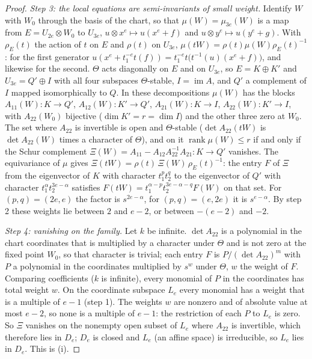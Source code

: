 \documentclass[11pt]{article}
\theoremstyle{definition}
\theoremstyle{remark}
\begin{document}
\begin{proof}
\emph{Step 3: the local equations are semi-invariants of small weight.} Identify $W$ with $W_0$ through the basis of the chart, so that $\mu(W)=\mu_{3e}(W)$ is a map from $E=U_{2e}\otimes W_0$ to $U_{3e}$, $u\otimes x^e\mapsto u(x^e+f)$ and $u\otimes y^e\mapsto u(y^e+g)$. With $\rho_E(t)$ the action of $t$ on $E$ and $\rho(t)$ on $U_{3e}$, $\mu(tW)=\rho(t)\mu(W)\rho_E(t)^{-1}$: for the first generator $u(x^e+t_1^{-e}t(f))=t_1^{-e}t\big(t^{-1}(u)(x^e+f)\big)$, and likewise for the second. $\Theta$ acts diagonally on $E$ and on $U_{3e}$, so $E=K\oplus K'$ and $U_{3e}=Q'\oplus I$ with all four subspaces $\Theta$-stable, $I=\operatorname{im}A$, and $Q'$ a complement of $I$ mapped isomorphically to $Q$. In these decompositions $\mu(W)$ has the blocks $A_{11}(W):K\to Q'$, $A_{12}(W):K'\to Q'$, $A_{21}(W):K\to I$, $A_{22}(W):K'\to I$, with $A_{22}(W_0)$ bijective ($\dim K'=r=\dim I$) and the other three zero at $W_0$. The set where $A_{22}$ is invertible is open and $\Theta$-stable ($\det A_{22}(tW)$ is $\det A_{22}(W)$ times a character of $\Theta$), and on it $\operatorname{rank}\mu(W)\le r$ if and only if the Schur complement $\Xi(W)=A_{11}-A_{12}A_{22}^{-1}A_{21}:K\to Q'$ vanishes. The equivariance of $\mu$ gives $\Xi(tW)=\rho(t)\,\Xi(W)\,\rho_E(t)^{-1}$: the entry $F$ of $\Xi$ from the eigenvector of $K$ with character $t_1^pt_2^q$ to the eigenvector of $Q'$ with character $t_1^{\alpha}t_2^{3e-\alpha}$ satisfies $F(tW)=t_1^{\alpha-p}t_2^{3e-\alpha-q}F(W)$ on that set. For $(p,q)=(2e,e)$ the factor is $s^{2e-\alpha}$, for $(p,q)=(e,2e)$ it is $s^{e-\alpha}$. By step 2 these weights lie between $2$ and $e-2$, or between $-(e-2)$ and $-2$.

\emph{Step 4: vanishing on the family.} Let $k$ be infinite. $\det A_{22}$ is a polynomial in the chart coordinates that is multiplied by a character under $\Theta$ and is not zero at the fixed point $W_0$, so that character is trivial; each entry $F$ is $P/(\det A_{22})^{m}$ with $P$ a polynomial in the coordinates multiplied by $s^{w}$ under $\Theta$, $w$ the weight of $F$. Comparing coefficients ($k$ is infinite), every monomial of $P$ in the coordinates has total weight $w$. On the coordinate subspace $L_e$ every monomial has a weight that is a multiple of $e-1$ (step 1). The weights $w$ are nonzero and of absolute value at most $e-2$, so none is a multiple of $e-1$: the restriction of each $P$ to $L_e$ is zero. So $\Xi$ vanishes on the nonempty open subset of $L_e$ where $A_{22}$ is invertible, which therefore lies in $D_e$; $D_e$ is closed and $L_e$ (an affine space) is irreducible, so $L_e$ lies in $D_e$. This is (i).


\end{proof}
\end{document}
